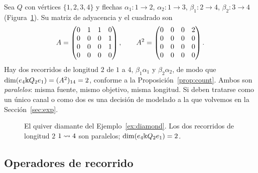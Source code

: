 \begin{example}\label{ex:diamond}
Sea $Q$ con vértices $\{1,2,3,4\}$ y flechas
$\alpha_1\colon 1\to2$, $\alpha_2\colon 1\to3$, $\beta_1\colon 2\to4$,
$\beta_2\colon 3\to4$ (Figura~\ref{fig:diamond}). Su matriz de adyacencia y el
cuadrado son
\[
  A=\begin{pmatrix}0&1&1&0\\0&0&0&1\\0&0&0&1\\0&0&0&0\end{pmatrix},
  \qquad
  A^2=\begin{pmatrix}0&0&0&2\\0&0&0&0\\0&0&0&0\\0&0&0&0\end{pmatrix}.
\]
Hay dos recorridos de longitud $2$ de $1$ a $4$,
$\beta_1\alpha_1$ y $\beta_2\alpha_2$, de modo que
$\dim(e_4\Bbbk Q_2 e_1)=(A^2)_{14}=2$, conforme a la
Proposición~\ref{prop:count}. Ambos son \emph{paralelos}: misma fuente,
mismo objetivo, misma longitud. Si deben tratarse como un único canal o como dos es
una decisión de modelado a la que volvemos en la Sección~\ref{sec:exp}.
\end{example}

\begin{figure}[t]
\centering
{}
\caption{El quiver diamante del Ejemplo~\ref{ex:diamond}. Los dos recorridos de longitud $2$
$1\rightsquigarrow 4$ son paralelos; $\dim(e_4\Bbbk Q_2 e_1)=2$.}
\label{fig:diamond}
\end{figure}

\subsection{Operadores de recorrido}

